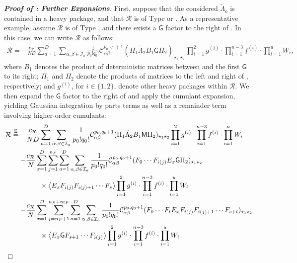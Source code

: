 \documentclass[10pt,reqno]{amsart}
\numberwithin{equation}{section}
\numberwithin{figure}{section}
\newcommand{\rmnum}[1]{\uppercase\expandafter{\romannumeral #1}}
\theoremstyle{plain} %
\theoremstyle{definition} %
\newcommand{\wt}{\widetilde}
\newcommand{\E}{\mathbb{E}}
\newcommand{\cI}{\mathcal{I}}
\newcommand{\cC}{\mathcal{C}}
\newcommand{\cR}{{\mathcal R}}
\newcommand{\cE}{{\mathcal{E}}}
\newcommand{\sG}{\mathsf G}
\newcommand{\sM}{\mathsf M}
\newcommand{\p}[1]{({#1})}
\newcommand{\pa}[1]{\left({#1}\right)}
\newcommand{\avga}[1]{\left\langle #1 \right\rangle}
\newcommand{\tLambda}{{\wt{\Lambda}}}
\newcommand{\bsum}[3]{\sum_{#1=1}^D\sum_{#2,#3\in \cI_{#1}}}
\newcommand{\iab}{\alpha\beta}
\newcommand{\tl}{\tLambda}
\newcommand{\eq}{\overset{\E}{=}}
\numberwithin{equation}{section}
\begin{document}
\begin{proof}[\bf Proof of : Further Expansions]
 
First, suppose that the considered $\tl_o$ is contained in a heavy package, and that $\cR$ is of Type \rmnum{1} or \rmnum{3}. As a representative example, assume $\cR$ is of Type \rmnum{1}, and there exists a $\sG$ factor to the right of \smash{$\tl_2$}. In this case, we can write $\cR$ as follows:
    \begin{equation}\label{explicit_reminder_term_1}
        \begin{aligned}
            \cR=-\frac{c_{\cR}}{ND}\bsum{a}{\alpha}{\beta}\frac{1}{p_0!q_0!}\cC_{\iab}^{p_0,q_0+1}\p{\Pi_1\tl_2B_1\sG\Pi_2}_{\star_1\star_2}\prod_{i=1}^{2}g^{\pa{i}}\cdot \prod_{i=1}^{n-3}f^{\pa{i}}\cdot \prod_{i=1}^{u}W_i,
        \end{aligned}
    \end{equation}
where $B_1$ denotes the product of deterministic matrices between \smash{$\tl_2$} and the first $\sG$ to its right; $\Pi_1$ and $\Pi_2$ denote the products of matrices to the left and right of \smash{$\tl_2 B_1 \sG$}, respectively; and $g^{(i)}$, for $i \in \{1,2\}$, denote other heavy packages within $\cR$. We then expand the $\sG$ factor to the right of \smash{$\tl_2$} and apply the cumulant expansion, yielding Gaussian integration by parts terms as well as a remainder term \smash{$\cE_\cR^{(2)}$} involving higher-order cumulants:
        \begin{align}\label{concrete_expansion_tl_2_heavy_package_right}
             \cR\eq  -&\frac{c_{\cR}}{ND}\bsum{a}{\alpha}{\beta}\frac{1}{p_0!q_0!}\cC_{\iab}^{p_0,q_0+1}\p{\Pi_1\tl_2B_1\sM\Pi_2}_{\star_1\star_2}\prod_{i=1}^{2}g^{\pa{i}}\cdot\prod_{i=1}^{n-3}f^{\pa{i}}\cdot\prod_{i=1}^{u}W_i\notag\\
            -&   \frac{c_{\cR}}{N} \sum_{x=1}^D \sum_{j=1}^{n_{F}}\bsum{a}{\alpha}{\beta}\frac{1}{p_0!q_0!}\cC_{\iab}^{p_0,q_0+1}\p{F_0\cdots F_{i\pa{j}}E_x\sG\Pi_2}_{\star_1\star_2}\notag\\
            &\qquad\times \avga{E_xF_{i\pa{j}}F_{i\pa{j}+1}\cdots F_{s}}\prod_{i=1}^{2}g^{\pa{i}}\cdot\prod_{i=1}^{n-3}f^{\pa{i}}\cdot\prod_{i=1}^{u}W_i\notag \\
            -& \frac{c_\cR}{N} \sum_{x=1}^D \sum_{j=n_F+1}^{n_F+m_F}\bsum{a}{\alpha}{\beta}\frac{1}{p_0!q_0!}\cC_{\iab}^{p_0,q_0+1}\p{F_0\cdots F_{t} E_x F_{i\pa{j}}F_{i\pa{j}+1}\cdots F_{s+t}}_{\star_1\star_2}\notag\\
            &\qquad\times \avga{E_x\sG F_{s+1}\cdots F_{i\pa{j}}} \prod_{i=1}^{2}g^{\pa{i}}\cdot\prod_{i=1}^{n-3}f^{\pa{i}}\cdot\prod_{i=1}^{u}W_i\notag\\

\end{align}
\end{proof}
\end{document}

